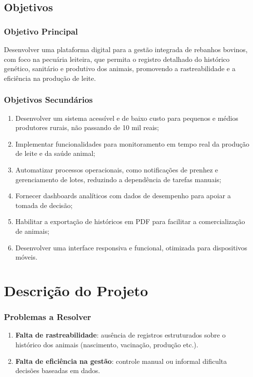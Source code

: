 \documentclass[12pt, a4paper]{article}
\begin{document}
\subsection{Objetivos}
\begin{spacing}{1.5}
\subsubsection{Objetivo Principal}
Desenvolver uma plataforma digital para a gestão integrada de rebanhos bovinos, com foco na pecuária leiteira, que permita o registro detalhado do histórico genético, sanitário e produtivo dos animais, promovendo a rastreabilidade e a eficiência na produção de leite.

\subsubsection{Objetivos Secundários}
\begin{enumerate}[label=\alph*)]
    \item Desenvolver um sistema acessível e de baixo custo para pequenos e médios produtores rurais, não passando de 10 mil reais;
    \item Implementar funcionalidades para monitoramento em tempo real da produção de leite e da saúde animal;
    \item Automatizar processos operacionais, como notificações de prenhez e gerenciamento de lotes, reduzindo a dependência de tarefas manuais;
    \item Fornecer dashboards analíticos com dados de desempenho para apoiar a tomada de decisão;
    \item Habilitar a exportação de históricos em PDF para facilitar a comercialização de animais;
    \item Desenvolver uma interface responsiva e funcional, otimizada para dispositivos móveis.
\end{enumerate}

\section{Descrição do Projeto}

\subsubsection{Problemas a Resolver}
\begin{enumerate}[label=\alph*)]
    \item \textbf{Falta de rastreabilidade}: ausência de registros estruturados sobre o histórico dos animais (nascimento, vacinação, produção etc.).
    \item \textbf{Falta de eficiência na gestão}: controle manual ou informal dificulta decisões baseadas em dados.
\end{enumerate}


\end{spacing}
\end{document}
